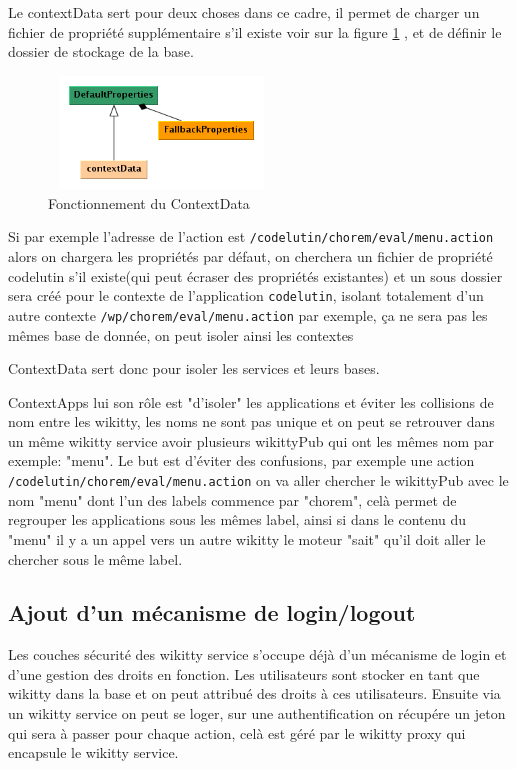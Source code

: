 Le contextData sert pour deux choses dans ce cadre, il permet de charger un 
fichier de propriété supplémentaire s'il existe voir sur la figure 
\ref{propertiescontext} , et de définir le dossier de stockage de la base. 

\begin{figure}[!ht]
\centering
\includegraphics[height=3cm,width=6cm]{image/propertiescontext.png}
  		\caption{Fonctionnement du ContextData}
  		\label{propertiescontext}
\end{figure}

Si par exemple l'adresse de l'action est \verb!/codelutin/chorem/eval/menu.action!
alors on chargera les propriétés par défaut, on cherchera un fichier de propriété
codelutin s'il existe(qui peut écraser des propriétés existantes) et un sous dossier
sera créé pour le contexte de l'application \verb!codelutin!, isolant totalement
d'un autre contexte \verb!/wp/chorem/eval/menu.action! par exemple, ça ne sera
pas les mêmes base de donnée, on peut isoler ainsi les contextes

ContextData sert donc pour isoler les services et leurs bases.

ContextApps lui son rôle est "d'isoler" les applications et éviter les collisions
de nom entre les wikitty, les noms ne sont pas unique et on peut se retrouver
dans un même wikitty service avoir plusieurs wikittyPub qui ont les mêmes nom par
exemple: "menu". Le but est d'éviter des confusions, par exemple une action
\verb!/codelutin/chorem/eval/menu.action! on va aller chercher le wikittyPub 
avec le nom "menu" dont l'un des labels commence par "chorem", celà permet de 
regrouper les applications sous les mêmes label, ainsi si dans le contenu du 
"menu" il y a un appel vers un autre wikitty le moteur "sait" qu'il doit 
aller le chercher sous le même label.


\subsection{Ajout d'un mécanisme de login/logout}

Les couches sécurité des wikitty service s'occupe déjà d'un mécanisme de login
et d'une gestion des droits en fonction. Les utilisateurs sont stocker en tant
que wikitty dans la base et on peut attribué des droits à ces utilisateurs.
Ensuite via un wikitty service on peut se loger, sur une authentification on
récupére un jeton qui sera à passer pour chaque action, celà est géré par le
wikitty proxy qui encapsule le wikitty service.

